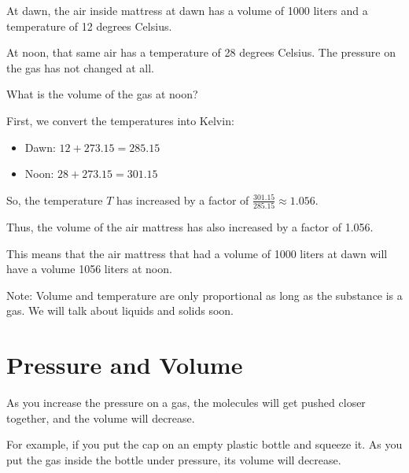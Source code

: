 \begin{Exercise}[title={Temperature and Volume}, label=temp_vol]
 
At dawn, the air inside mattress at dawn has a volume of 1000 liters and a temperature of 12 degrees Celsius.

At noon, that same air has a temperature of 28 degrees Celsius. The pressure on the gas has not changed at all.

What is the volume of the gas at noon?

\end{Exercise}
\begin{Answer}[ref=temp_vol]

First, we convert the temperatures into Kelvin: 
\begin{itemize}
\item Dawn: $12 + 273.15 = 285.15$
\item Noon: $28 + 273.15 = 301.15$
\end{itemize}

So, the temperature $T$ has increased by a factor of $\frac{301.15}{285.15} \approx 1.056$.

Thus, the volume of the air mattress has also increased by a factor of 1.056. 

This means that the air mattress that had a volume of 1000 liters at dawn will have a volume 1056 liters at noon.

\end{Answer}

Note: Volume and temperature are only proportional as long as the substance is a gas. We will talk about liquids and solids soon.

\section{Pressure and Volume}

As you increase the pressure on a gas, the molecules will get pushed closer together, and the volume will decrease.

For example, if you put the cap on an empty plastic bottle and squeeze it.  As you put the gas inside the bottle under pressure, its volume will decrease. 

